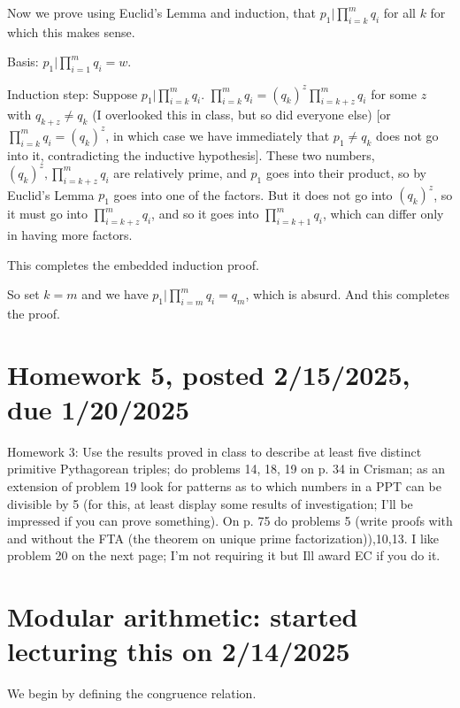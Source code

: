 \documentclass[12pt]{article}
\begin{document}
\begin{description}
Now we prove using Euclid's Lemma and induction, that $p_1 | \prod_{i=k}^m q_i$ for all $k$ for which this makes sense.

Basis:  $p_1 | \prod_{i=1}^m q_i = w$.

Induction step:  Suppose $p_1 | \prod_{i=k}^m q_i$.  $\prod_{i=k}^m q_i= (q_k)^z\prod_{i=k+z}^m q_i$ for some $z$ with $q_{k+z}\neq q_k$ (I overlooked this in class, but so did everyone else) [or $\prod_{i=k}^m q_i= (q_k)^z$, in which case we have immediately that $p_1\neq q_k$ does not go into it, contradicting the inductive hypothesis].  These two numbers,  $(q_k)^z, \prod_{i=k+z}^m q_i$ are relatively prime, and $p_1$ goes into their product, so by Euclid's Lemma $p_1$ goes into one of the factors.  But it does not go into $(q_k)^z$, so it must go into $\prod_{i=k+z}^m q_i$,
and so it goes into $\prod_{i=k+1}^m q_i$, which can differ only in having more factors.

This completes the embedded induction proof.

So set $k=m$ and we have $p_1 | \prod_{i=m}^m q_i = q_m$, which is absurd. And this completes the proof.


\newpage

\end{description}


\section{Homework 5, posted 2/15/2025, due 1/20/2025}

Homework 3: Use the results proved in class to describe at least five distinct primitive Pythagorean triples; do problems 14, 18, 19 on p. 34 in Crisman; as an extension of problem 19 look for patterns as to which numbers in a PPT can be divisible by 5 (for this, at least display some results of investigation; I'll be impressed if you can prove something). On p. 75 do problems 5 (write proofs with and without the FTA (the theorem on unique prime factorization)),10,13. I like problem 20 on the next page; I'm not requiring it but Ill award EC if you do it.

\newpage

\section{Modular arithmetic:  started lecturing this on 2/14/2025}

We begin by defining the congruence relation.
\end{document}
